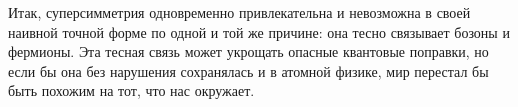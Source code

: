Итак, суперсимметрия одновременно привлекательна и невозможна в своей наивной точной форме по одной и той же причине: она тесно связывает бозоны и фермионы. Эта тесная связь может укрощать опасные квантовые поправки, но если бы она без нарушения сохранялась и в атомной физике, мир перестал бы быть похожим на тот, что нас окружает.
